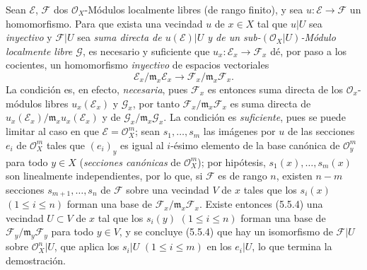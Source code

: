 \begin{env}[5.5.5]
\label{0.5.5.5-fr}
Sean $\mathcal{E}$, $\mathcal{F}$ dos $\mathcal{O}_X$-Módulos localmente
libres (de rango finito), y sea $u:\mathcal{E}\to\mathcal{F}$ un
homomorfismo. Para que exista una vecindad $u$ de $x\in X$ tal que $u|U$
sea \emph{inyectivo} y $\mathcal{F}|U$ sea \emph{suma directa de
$u(\mathcal{E})|U$ y de un sub-$(\mathcal{O}_X|U)$-Módulo localmente libre
$\mathcal{G}$}, es necesario y suficiente que
$u_x:\mathcal{E}_x\to\mathcal{F}_x$ dé, por paso a los cocientes, un
homomorfismo \emph{inyectivo} de espacios vectoriales
\[
  \mathcal{E}_x/\mathfrak{m}_x\mathcal{E}_x
  \longrightarrow
  \mathcal{F}_x/\mathfrak{m}_x\mathcal{F}_x.
\]
La condición es, en efecto, \emph{necesaria}, pues $\mathcal{F}_x$ es entonces
suma directa de los $\mathcal{O}_x$-módulos libres $u_x(\mathcal{E}_x)$ y
$\mathcal{G}_x$, por tanto $\mathcal{F}_x/\mathfrak{m}_x\mathcal{F}_x$ es suma
directa de
$u_x(\mathcal{E}_x)/\mathfrak{m}_x u_x(\mathcal{E}_x)$ y de
$\mathcal{G}_x/\mathfrak{m}_x\mathcal{G}_x$. La condición es
\emph{suficiente}, pues se puede limitar al caso en que
$\mathcal{E}=\mathcal{O}_X^m$; sean $s_1,\ldots,s_m$ las imágenes por $u$ de las
secciones $e_i$ de $\mathcal{O}_X^m$ tales que $(e_i)_y$ es igual al $i$-ésimo
elemento de la base canónica de $\mathcal{O}_y^m$ para todo $y\in X$
(\emph{secciones canónicas} de $\mathcal{O}_X^m$); por hipótesis,
$s_1(x),\ldots,s_m(x)$ son linealmente independientes, por lo que, si $\mathcal{F}$
es de rango $n$, existen $n-m$ secciones $s_{m+1},\ldots,s_n$ de
$\mathcal{F}$ sobre una vecindad $V$ de $x$ tales que los $s_i(x)$
$(1\leq i\leq n)$ forman una base de
$\mathcal{F}_x/\mathfrak{m}_x\mathcal{F}_x$. Existe entonces (5.5.4) una
vecindad $U\subset V$ de $x$ tal que los $s_i(y)$ $(1\leq i\leq n)$ forman
una base de $\mathcal{F}_y/\mathfrak{m}_y\mathcal{F}_y$ para todo $y\in V$,
y se concluye (5.5.4) que hay un isomorfismo de $\mathcal{F}|U$ sobre
$\mathcal{O}_X^n|U$, que aplica los $s_i|U$ $(1\leq i\leq m)$ en los
$e_i|U$, lo que termina la demostración.
\end{env}

